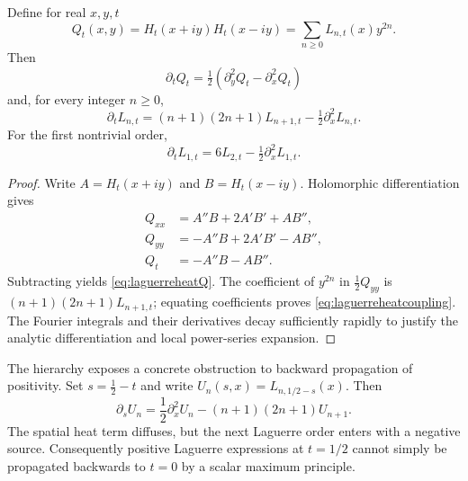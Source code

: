 \begin{proposition}
\label{prop:laguerreheat}
Define for real $x,y,t$
\[
Q_t(x,y)=H_t(x+iy)H_t(x-iy)
=\sum_{n\ge0}L_{n,t}(x)y^{2n}.
\]
Then
\begin{equation}
\partial_t Q_t
=\tfrac12(\partial_y^2Q_t-\partial_x^2Q_t)
\label{eq:laguerreheatQ}
\end{equation}
and, for every integer $n\ge0$,
\begin{equation}
\boxed{\partial_t L_{n,t}
=(n+1)(2n+1)L_{n+1,t}
-\tfrac12\partial_x^2L_{n,t}.}
\label{eq:laguerreheatcoupling}
\end{equation}
For the first nontrivial order,
\[
\partial_tL_{1,t}
=6L_{2,t}-\tfrac12\partial_x^2L_{1,t}.
\]
\end{proposition}
\begin{proof}
Write $A=H_t(x+iy)$ and $B=H_t(x-iy)$.
Holomorphic differentiation gives
\begin{align*}
Q_{xx}&=A''B+2A'B'+AB'',\\
Q_{yy}&=-A''B+2A'B'-AB'',\\
Q_t&=-A''B-AB''.
\end{align*}
Subtracting yields \eqref{eq:laguerreheatQ}.
The coefficient of $y^{2n}$ in
$\tfrac12Q_{yy}$ is
$(n+1)(2n+1)L_{n+1,t}$;
equating coefficients proves
\eqref{eq:laguerreheatcoupling}.
The Fourier integrals and their derivatives
decay sufficiently rapidly to justify the
analytic differentiation and local
power-series expansion.
\end{proof}

The hierarchy exposes a concrete obstruction to
backward propagation of positivity.
Set $s=\frac12-t$ and write
$U_n(s,x)=L_{n,1/2-s}(x)$.
Then
\begin{equation}
\partial_sU_n
=\frac12\partial_x^2U_n
-(n+1)(2n+1)U_{n+1}.
\label{eq:backwardlaguerre}
\end{equation}
The spatial heat term diffuses, but the next
Laguerre order enters with a negative source.
Consequently positive Laguerre expressions at
$t=1/2$ cannot simply be propagated backwards
to $t=0$ by a scalar maximum principle.

